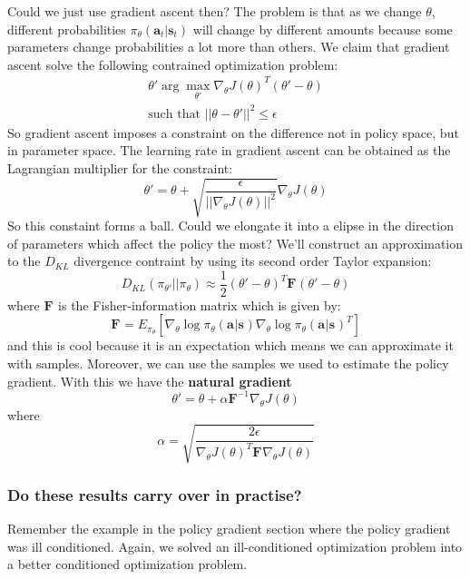 \documentclass{report}
\newcommand{\argmax}{\arg\!\max}
\begin{document}
Could we just use gradient ascent then?
The problem is that as we change $ \theta  $,
different probabilities $ \pi_{ \theta }(\bm{a}_{t}| \bm{s}_{t} )  $ will change 
by different amounts because some parameters change probabilities a lot more
than others.
We claim that gradient ascent solve the following contrained
optimization problem:
\begin{gather}
\theta' \argmax_{\theta'} \nabla_{ \theta } J (\theta)^{ T } (\theta' - \theta) \\
\text{such that } ||\theta - \theta'||^{ 2 } \leq \epsilon
\end{gather}
So gradient ascent imposes a constraint on the difference not in policy space,
but in parameter space.
The learning rate in gradient ascent can be obtained as the Lagrangian multiplier
for the constraint:
\begin{equation}
		\theta' = \theta + \sqrt{\frac{\epsilon}{||\nabla_{ \theta } J(\theta)||^{ 2 }} } \nabla_{ \theta } J (\theta) 
\end{equation}
So this constaint forms a ball.
Could we elongate it into a elipse in the direction 
of parameters which affect the policy the most?
We'll construct an approximation to the $ D_{ KL }  $ divergence contraint by using its
second order Taylor expansion:
\begin{equation}
		D_{ KL } (\pi_{ \theta' } || \pi_{ \theta })
		\approx \frac{1}{2} (\theta' -\theta)^{ T } \bm{F}_{} (\theta' -\theta)
\end{equation}
where $ \bm{F}_{}  $ is the Fisher-information matrix which is given by:
\begin{equation}
		\bm{F}_{} = E_{ \pi_{ \theta } } \left[ 
		\nabla_{ \theta } \log 
		\pi_{ \theta } (\bm{a}_{}| \bm{s}_{} ) \nabla_{ \theta } \log \pi_{ \theta } (\bm{a}_{}| \bm{s}_{} )^{ T }
\right] 
\end{equation}
and this is cool because it is an expectation which means we can approximate it with samples.
Moreover, we can use the samples we used to estimate the policy gradient.
With this we have the \textbf{natural gradient}
\begin{equation}
		\theta' = \theta + \alpha \bm{F}_{}^{ -1 } \nabla_{ \theta } J (\theta)
\end{equation}
where
\begin{equation}
		\alpha = \sqrt{\frac{2\epsilon}{\nabla_{ \theta } J (\theta)^{ T } \bm{F}_{} \nabla_{ \theta } J (\theta)} }
\end{equation}

\subsubsection{Do these results carry over in practise?}
Remember the example in the policy gradient section where the policy gradient was ill conditioned.
Again, we solved an ill-conditioned optimization problem into a better conditioned optimization problem.
\end{document}
